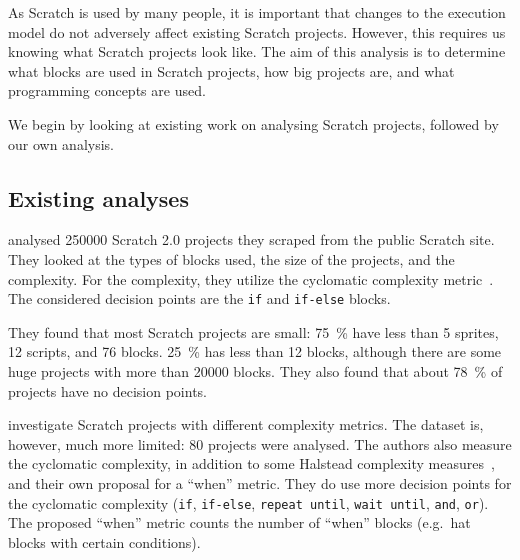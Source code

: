 \documentclass[../main]{subfiles}
\begin{document}
As Scratch is used by many people, it is important that changes to the execution model do not adversely affect existing Scratch projects.
However, this requires us knowing what Scratch projects look like.
The aim of this analysis is to determine what blocks are used in Scratch projects, how big projects are, and what programming concepts are used.

We begin by looking at existing work on analysing Scratch projects, followed by our own analysis.

\subsection{Existing analyses}\label{subsec:existing-analyses}

\Textcite{aivaloglouHowKidsCode2016} analysed \num{250000} Scratch 2.0 projects they scraped from the public Scratch site.
They looked at the types of blocks used, the size of the projects, and the complexity.
For the complexity, they utilize the cyclomatic complexity metric~\autocite{mccabeComplexityMeasure1976}.
The considered decision points are the \texttt{if} and \texttt{if-else} blocks.

They found that most Scratch projects are small: \qty{75}{\percent} have less than 5 sprites, 12 scripts, and 76 blocks.
\qty{25}{\percent} has less than 12 blocks, although there are some huge projects with more than \num{20000} blocks.
They also found that about \qty{78}{\percent} of projects have no decision points.

\Textcite{fronzaApproachEvaluateComplexity2020} investigate Scratch projects with different complexity metrics.
The dataset is, however, much more limited: 80 projects were analysed.
The authors also measure the cyclomatic complexity, in addition to some Halstead complexity measures~\autocite{halsteadElementsSoftwareScience1977}, and their own proposal for a ``when'' metric.
They do use more decision points for the cyclomatic complexity (\texttt{if}, \texttt{if-else}, \texttt{repeat until}, \texttt{wait until}, \texttt{and}, \texttt{or}).
The proposed ``when'' metric counts the number of ``when'' blocks (e.g.\ hat blocks with certain conditions).
\end{document}
